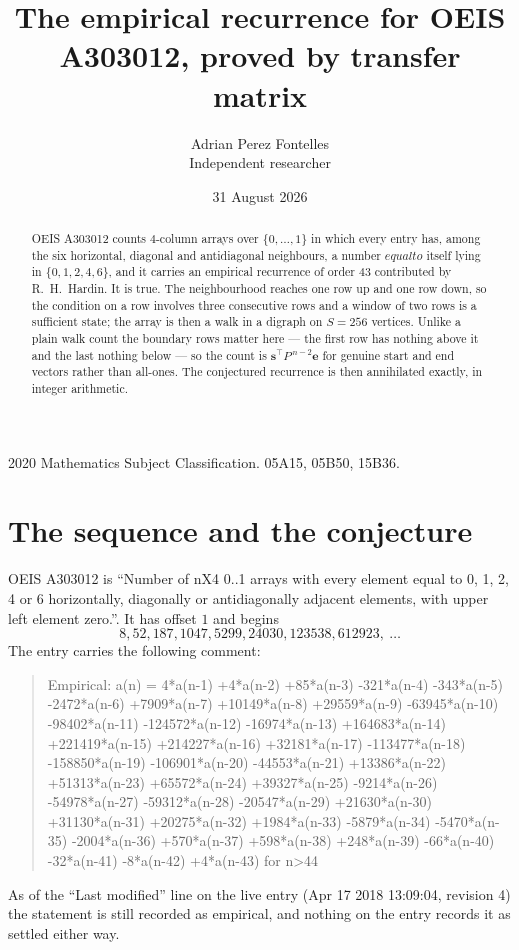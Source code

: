 \documentclass[11pt,a4paper]{article}
\title{The empirical recurrence for OEIS A303012, proved by transfer matrix}
\author{Adrian Perez Fontelles\\ \small Independent researcher}
\date{31 August 2026}
\theoremstyle{plain}
\theoremstyle{definition}
\begin{document}
\maketitle

\begin{abstract}
OEIS A303012 counts $4$-column arrays over $\{0,\dots,1\}$ in which every entry has,
among the six horizontal, diagonal and antidiagonal neighbours, a number $equal to$ itself lying in $\{0,1,2,4,6\}$, and it carries an empirical
recurrence of order $43$ contributed by R.~H.~Hardin. It is true. The neighbourhood
reaches one row up and one row down, so the condition on a row involves three consecutive
rows and a window of two rows is a sufficient state; the array is then a walk in a digraph
on $S=256$ vertices. Unlike a plain walk count the boundary rows matter here --- the first
row has nothing above it and the last nothing below --- so the count is
$\mathbf{s}^{\!\top}P^{\,n-2}\mathbf{e}$ for genuine start and end vectors rather than
all-ones. The conjectured recurrence is then annihilated exactly, in integer arithmetic.
\end{abstract}

\noindent\small 2020 Mathematics Subject Classification. 05A15, 05B50, 15B36.\normalsize

\section{The sequence and the conjecture}

OEIS A303012 is ``Number of nX4 0..1 arrays with every element equal to 0, 1, 2, 4 or 6 horizontally, diagonally or antidiagonally adjacent elements, with upper left element zero.''. It has offset
$1$ and begins
\[
8, 52, 187, 1047, 5299, 24030, 123538, 612923,\ \dots
\]
The entry carries the following comment:
\begin{quote}\small
Empirical: a(n) = 4*a(n-1) +4*a(n-2) +85*a(n-3) -321*a(n-4) -343*a(n-5) -2472*a(n-6) +7909*a(n-7) +10149*a(n-8) +29559*a(n-9) -63945*a(n-10) -98402*a(n-11) -124572*a(n-12) -16974*a(n-13) +164683*a(n-14) +221419*a(n-15) +214227*a(n-16) +32181*a(n-17) -113477*a(n-18) -158850*a(n-19) -106901*a(n-20) -44553*a(n-21) +13386*a(n-22) +51313*a(n-23) +65572*a(n-24) +39327*a(n-25) -9214*a(n-26) -54978*a(n-27) -59312*a(n-28) -20547*a(n-29) +21630*a(n-30) +31130*a(n-31) +20275*a(n-32) +1984*a(n-33) -5879*a(n-34) -5470*a(n-35) -2004*a(n-36) +570*a(n-37) +598*a(n-38) +248*a(n-39) -66*a(n-40) -32*a(n-41) -8*a(n-42) +4*a(n-43) for n>44
\end{quote}
As of the ``Last modified'' line on the live entry (Apr 17 2018 13:09:04, revision
4) the statement is still recorded as empirical, and nothing on the entry
records it as settled either way.
\end{document}
